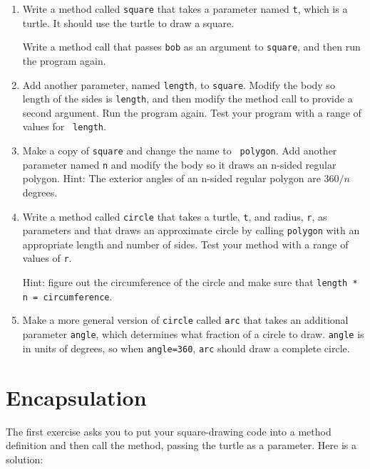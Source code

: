 \documentclass[10pt]{book}
\begin{document}
\begin{enumerate}

\item Write a method called {\tt square} that takes a parameter
named {\tt t}, which is a turtle.  It should use the turtle to draw
a square.

Write a method call that passes {\tt bob} as an argument to
{\tt square}, and then run the program again.

\item Add another parameter, named {\tt length}, to {\tt square}.
Modify the body so length of the sides is {\tt length}, and then
modify the method call to provide a second argument.  Run the
program again.  Test your program with a range of values for {\tt
length}.

\item Make a copy of {\tt square} and change the name to {\tt
  polygon}.  Add another parameter named {\tt n} and modify the body
  so it draws an n-sided regular polygon.  Hint: The exterior angles
  of an n-sided regular polygon are $360/n$ degrees.   

\item Write a method called {\tt circle} that takes a turtle, 
{\tt t}, and radius, {\tt r}, as parameters and that draws an
approximate circle by calling {\tt polygon} with an appropriate
length and number of sides.  Test your method with a range of values
of {\tt r}.   

Hint: figure out the circumference of the circle and make sure that
{\tt length * n = circumference}.

\item Make a more general version of {\tt circle} called {\tt arc}
that takes an additional parameter {\tt angle}, which determines
what fraction of a circle to draw.  {\tt angle} is in units of
degrees, so when {\tt angle=360}, {\tt arc} should draw a complete
circle.

\end{enumerate}


\section{Encapsulation}

The first exercise asks you to put your square-drawing code
into a method definition and then call the method, passing
the turtle as a parameter.  Here is a solution:
\end{document}

